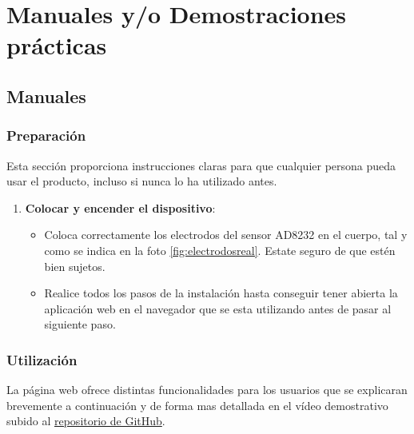 \section{Manuales y/o Demostraciones prácticas}

\subsection{Manuales}

\subsubsection{Preparación}
Esta sección proporciona instrucciones claras para que cualquier persona pueda usar el producto, incluso si nunca lo ha utilizado antes.

\begin{enumerate}
    \item \textbf{Colocar y encender el dispositivo}:
    \begin{itemize}
        \item Coloca correctamente los electrodos del sensor AD8232 en el cuerpo, tal y como se indica en la foto \ref{fig:electrodosreal}. Estate seguro de que estén bien sujetos.
        \item Realice todos los pasos de la instalación hasta conseguir tener abierta la aplicación web en el navegador que se esta utilizando antes de pasar al siguiente paso.
    \end{itemize}
\end{enumerate}

\subsubsection{Utilización}
La página web ofrece distintas funcionalidades para los usuarios que se explicaran brevemente a continuación y de forma mas detallada en el vídeo demostrativo subido al \href{https://github.com/diegotrascasa/TFG_Diego_Trascasa_Garcia}{repositorio de GitHub}.

